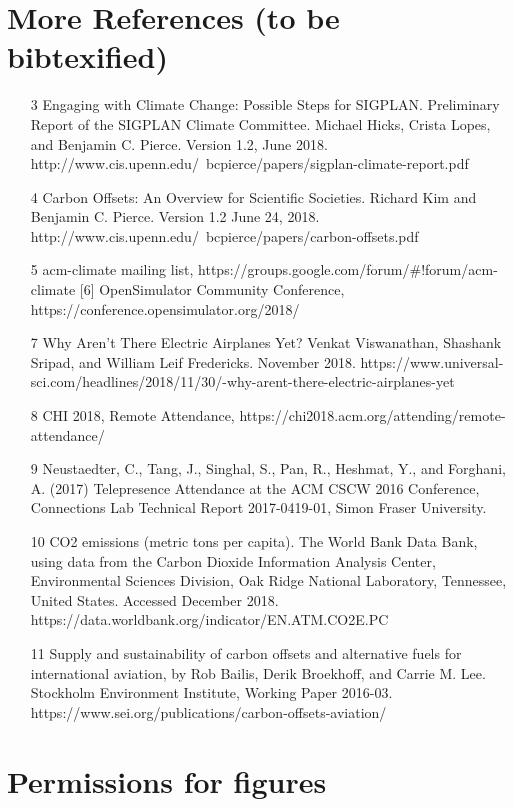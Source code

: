 \documentclass[12pt]{article}
\newif\ifdraft\drafttrue
\begin{document}
\section*{More References (to be bibtexified)}
\begin{itemize}
\item 
[3] Engaging with Climate Change: Possible Steps for SIGPLAN. Preliminary Report of the SIGPLAN Climate Committee.  Michael Hicks,​ ​Crista Lopes, and​ ​Benjamin C. Pierce. Version 1.2, June 2018. http://www.cis.upenn.edu/~bcpierce/papers/sigplan-climate-report.pdf
\item [4] Carbon Offsets: An Overview for Scientific Societies.  Richard Kim and ​Benjamin C. Pierce. Version 1.2 June 24, 2018.  http://www.cis.upenn.edu/~bcpierce/papers/carbon-offsets.pdf
\item[5] acm-climate mailing list, https://groups.google.com/forum/\#!forum/acm-climate
[6] OpenSimulator Community Conference, https://conference.opensimulator.org/2018/
\item [7] Why Aren’t There Electric Airplanes Yet? Venkat Viswanathan, Shashank Sripad, and William Leif Fredericks. November 2018. https://www.universal-sci.com/headlines/2018/11/30/-why-arent-there-electric-airplanes-yet
\item [8] CHI 2018, Remote Attendance, https://chi2018.acm.org/attending/remote-attendance/
\item [9] Neustaedter, C., Tang, J., Singhal, S., Pan, R., Heshmat, Y., and Forghani, A. (2017) Telepresence Attendance at the ACM CSCW 2016 Conference, Connections Lab Technical Report 2017-0419-01, Simon Fraser University.
\item [10] CO2 emissions (metric tons per capita). The World Bank Data Bank, using data from the Carbon Dioxide Information Analysis Center, Environmental Sciences Division, Oak Ridge National Laboratory, Tennessee, United States. Accessed December 2018. https://data.worldbank.org/indicator/EN.ATM.CO2E.PC
\item [11]  Supply and sustainability of carbon offsets and alternative fuels for international aviation, by
Rob Bailis, Derik Broekhoff, and Carrie M. Lee.  Stockholm Environment Institute, Working Paper 2016-03. https://www.sei.org/publications/carbon-offsets-aviation/			
\end{itemize}


\ifdraft
\newpage
\section*{Permissions for figures}
\end{document}
